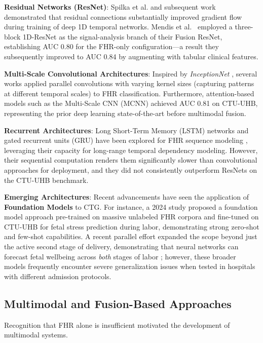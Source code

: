 \documentclass[conference]{IEEEtran}
\begin{document}
\textbf{Residual Networks (ResNet)}: Spilka et al. \cite{spilka2016} and
subsequent work demonstrated that residual connections substantially improved
gradient flow during training of deep 1D temporal networks. Mendis et
al.\ \cite{mendis2023} employed a three-block 1D-ResNet as the signal-analysis
branch of their Fusion ResNet, establishing AUC 0.80 for the FHR-only
configuration—a result they subsequently improved to AUC 0.84 by augmenting
with tabular clinical features.

\textbf{Multi-Scale Convolutional Architectures}: Inspired by
\textit{InceptionNet} \cite{szegedy2015}, several works applied parallel
convolutions with varying kernel sizes (capturing patterns at different
temporal scales) to FHR classification. Furthermore, attention-based models
such as the Multi-Scale CNN (MCNN) \cite{zhao2019} achieved AUC 0.81 on
CTU-UHB, representing the prior deep learning state-of-the-art before
multimodal fusion.

\textbf{Recurrent Architectures}: Long Short-Term Memory (LSTM) networks and
gated recurrent units (GRU) have been explored for FHR sequence modeling
\cite{xue2021}, leveraging their capacity for long-range temporal dependency
modeling. However, their sequential computation renders them significantly
slower than convolutional approaches for deployment, and they did not
consistently outperform ResNets on the CTU-UHB benchmark.

\textbf{Emerging Architectures}: Recent advancements have seen the application of
\textbf{Foundation Models} to CTG. For instance, a 2024 study \cite{foundation2024}
proposed a foundation model approach pre-trained on massive unlabeled FHR corpora
and fine-tuned on CTU-UHB for fetal stress prediction during labor, demonstrating
strong zero-shot and few-shot capabilities. A recent parallel effort expanded the scope beyond just the active second stage of delivery, demonstrating that neural networks can forecast fetal wellbeing across \textit{both} stages of labor \cite{bothstages2023}; however, these broader models frequently encounter severe generalization issues when tested in hospitals with different admission protocols.

\subsection{Multimodal and Fusion-Based Approaches}

Recognition that FHR alone is insufficient motivated the development of
multimodal systems.
\end{document}
